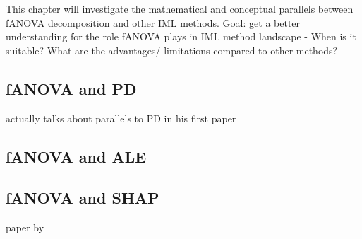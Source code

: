 This chapter will investigate the mathematical and conceptual parallels between fANOVA decomposition and other IML methods. Goal: get a better understanding for the role fANOVA plays in IML method landscape - When is it suitable? What are the advantages/ limitations compared to other methods?



\subsection{fANOVA and PD}
\cite{hooker2004} actually talks about parallels to PD in his first paper

\subsection{fANOVA and ALE}

\subsection{fANOVA and SHAP}
paper by \cite{andrewniianang2024}
